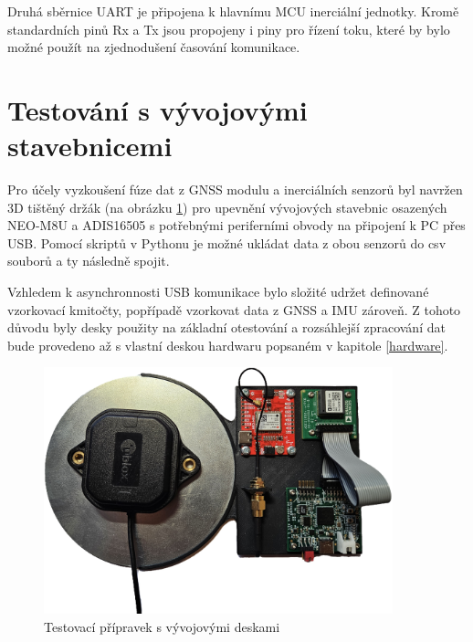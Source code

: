 Druhá sběrnice \ac{UART} je připojena k hlavnímu \ac{MCU} inerciální jednotky. Kromě standardních pinů Rx a Tx jsou propojeny i piny pro řízení toku, které by bylo možné použít na zjednodušení časování komunikace.

\section{Testování s vývojovými stavebnicemi}
Pro účely vyzkoušení fúze dat z \ac{GNSS} modulu a inerciálních senzorů byl navržen 3D tištěný držák (na obrázku \ref{fig:devBoards}) pro upevnění vývojových stavebnic osazených NEO-M8U a ADIS16505 s potřebnými periferními obvody na připojení k PC přes \ac{USB}. Pomocí skriptů v Pythonu je možné ukládat data z obou senzorů do csv souborů a ty následně spojit.

Vzhledem k asynchronnosti \ac{USB} komunikace bylo složité udržet definované vzorkovací kmitočty, popřípadě vzorkovat data z \ac{GNSS} a \ac{IMU} zároveň. Z tohoto důvodu byly desky použity na základní otestování a rozsáhlejší zpracování dat bude provedeno až s vlastní deskou hardwaru popsaném v kapitole \ref{hardware}.
\begin{figure}[h] 
    \centering
    \includegraphics[width=0.9\textwidth]{obrazky/devBoards}
    \caption{Testovací přípravek s vývojovými deskami}
    \label{fig:devBoards}
\end{figure}

